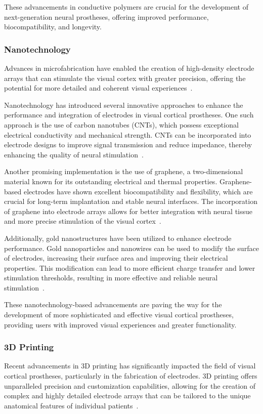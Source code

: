 \documentclass[twocolumn,10pt]{article}
\begin{document}
These advancements in conductive polymers are crucial for the development of
next-generation neural prostheses, offering improved performance,
biocompatibility, and longevity.

\subsubsection*{Nanotechnology}
Advances in microfabrication have enabled the creation of high-density electrode
arrays that can stimulate the visual cortex with greater precision, offering the
potential for more detailed and coherent visual
experiences~\cite{ryuSpatiallyConfinedResponses2020}.

Nanotechnology has introduced several innovative approaches to enhance the
performance and integration of electrodes in visual cortical prostheses. One
such approach is the use of carbon nanotubes (CNTs), which possess exceptional
electrical conductivity and mechanical strength. CNTs can be incorporated into
electrode designs to improve signal transmission and reduce impedance, thereby
enhancing the quality of neural
stimulation~\cite{alegretThreeDimensionalConductiveScaffolds2018}.

Another promising implementation is the use of graphene, a two-dimensional
material known for its outstanding electrical and thermal properties.
Graphene-based electrodes have shown excellent biocompatibility and flexibility,
which are crucial for long-term implantation and stable neural interfaces. The
incorporation of graphene into electrode arrays allows for better integration
with neural tissue and more precise stimulation of the visual
cortex~\cite{luGraphenebasedNeurotechnologiesAdvanced2018}.

Additionally, gold nanostructures have been utilized to enhance electrode
performance. Gold nanoparticles and nanowires can be used to modify the surface
of electrodes, increasing their surface area and improving their electrical
properties. This modification can lead to more efficient charge transfer and
lower stimulation thresholds, resulting in more effective and reliable neural
stimulation~\cite{zareGoldNanostructuresSynthesis2022}.

These nanotechnology-based advancements are paving the way for the development
of more sophisticated and effective visual cortical prostheses, providing users
with improved visual experiences and greater functionality.

\subsubsection*{3D Printing}
Recent advancements in 3D printing has significantly impacted the field of
visual cortical prostheses, particularly in the fabrication of electrodes. 3D
printing offers unparalleled precision and customization capabilities, allowing
for the creation of complex and highly detailed electrode arrays that can be
tailored to the unique anatomical features of individual
patients~\cite{guoImplantableLiquidMetalbased2017}.
\end{document}
